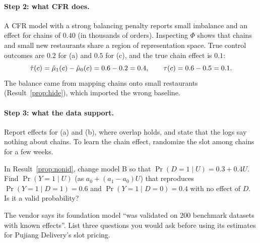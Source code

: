 \documentclass[11pt]{article}
\begin{document}
\paragraph{Step 2: what CFR does.} A CFR model with a strong balancing penalty reports small imbalance and an effect for
chains of $0.40$ (in thousands of orders). Inspecting $\Phi$ shows that chains and small new restaurants share a region of
representation space. True control outcomes are $0.2$ for (a) and $0.5$ for (c), and the true chain effect is $0.1$:
\[
  \hat{\tau}(c) = \hat\mu_1(c) - \hat\mu_0(c) = 0.6 - 0.2 = 0.4, \qquad \tau(c) = 0.6 - 0.5 = 0.1 .
\]
The balance came from mapping chains onto small restaurants (Result~\ref{prop:hide}), which imported the wrong
baseline.

\paragraph{Step 3: what the data support.} Report effects for (a) and (b), where overlap holds, and state that the logs say
nothing about chains. To learn the chain effect, randomize the slot among chains for a few weeks.

\begin{exercise}[computation]
In Result~\ref{prop:nonid}, change model B so that $\Pr(D=1 \mid U) = 0.3 + 0.4U$. Find $\Pr(Y=1 \mid U)$ (as $a_0 + (a_1 - a_0)U$)
that reproduces $\Pr(Y=1 \mid D=1) = 0.6$ and $\Pr(Y=1 \mid D=0) = 0.4$ with no effect of $D$. Is it a valid probability?
\end{exercise}

\begin{exercise}[judgment]
The vendor says its foundation model ``was validated on 200 benchmark datasets with known effects''. List three
questions you would ask before using its estimates for Pujiang Delivery's slot pricing.
\end{exercise}
\end{document}
